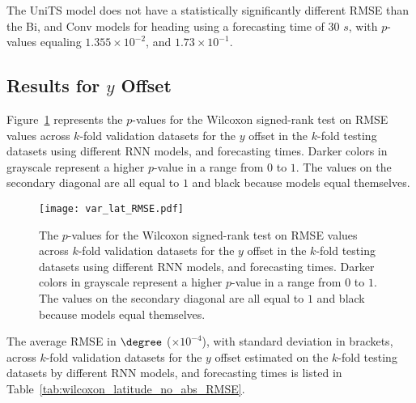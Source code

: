 The UniTS model does not have a statistically significantly different RMSE than the Bi, and Conv models for heading using a forecasting time of $30$ $s$, with $p$-values equaling $1.355 \times 10^{-2}$, and $1.73 \times 10^{-1}$.

\subsection{Results for $y$ Offset}

Figure~\ref{fig:var_lat_RMSE} represents the $p$-values for the Wilcoxon signed-rank test on RMSE values across $k$-fold validation datasets for the $y$ offset in the $k$-fold testing datasets using different RNN models, and forecasting times. Darker colors in grayscale represent a higher $p$-value in a range from $0$ to $1$. The values on the secondary diagonal are all equal to $1$ and black because models equal themselves.

\begin{figure}[!ht]
	\centering
	\texttt{[image: var\_lat\_RMSE.pdf]}
	\caption{The $p$-values for the Wilcoxon signed-rank test on RMSE values across $k$-fold validation datasets for the $y$ offset in the $k$-fold testing datasets using different RNN models, and forecasting times. Darker colors in grayscale represent a higher $p$-value in a range from $0$ to $1$. The values on the secondary diagonal are all equal to $1$ and black because models equal themselves.}
	\label{fig:var_lat_RMSE}
\end{figure}

The average RMSE in $\degree$ ($\times 10^{-4}$), with standard deviation in brackets, across $k$-fold validation datasets for the $y$ offset estimated on the $k$-fold testing datasets by different RNN models, and forecasting times is listed in Table~\ref{tab:wilcoxon_latitude_no_abs_RMSE}.


